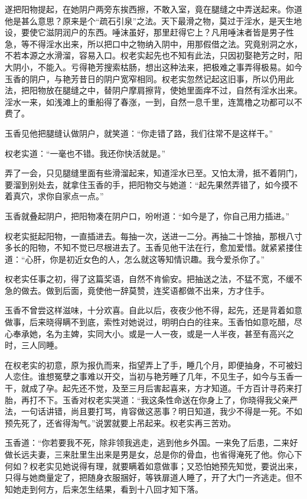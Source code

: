 \documentclass[a4paper,12pt,UTF8,twoside]{ctexbook}
\begin{document}
遂把阳物提起，在她阴户两旁东挨西擦，不敢入室，竟在腿缝之中弄送起来。你道他是甚么意思？原来是个“疏石引泉”之法。天下最滑之物，莫过于淫水，是天生地设，要使它滋阴润户的东西。唾沫虽好，那里赶得它上？凡用唾沫者皆是男子性急，等不得淫水出来，所以把口中之物纳入阴中，用那假借之法。究竟别洞之水，不若本源之水滑溜，容易入口。权老实起先也不知有此法，只因初娶艳芳之时，阳大阴小，不能入。亏得艳芳搜索枯肠，想出这种法来，把极难之事弄得极易。如今玉香的阴户，与艳芳昔日的阴户宽窄相同。权老实忽然记起这旧事，所以仍用此法，把阳物放在腿缝之中，替阴户摩肩擦背，使她里面痒不过，自然有淫水出来。淫水一来，如浅滩上的重船得了春涨，一到，自然一息千里，连篙橹之功都可以不费了。

玉香见他把腿缝认做阴户，就笑道：“你走错了路，我们往常不是这样干。”

权老实道：“一毫也不错。我还你快活就是。”

弄了一会，只见腿缝里面有些滑溜起来，知道淫水已至。又怕太滑，抵不着阴门，要溜到别处去，就拿住玉香的手，把阳物交与她道：“起先果然弄错了，如今摸不着真穴，求你自家点一点。”

玉香就叠起阴户，把阳物凑在阴户口，吩咐道：“如今是了，你自己用力插进。”

权老实挺起阳物，一直插进去。每抽一次，送进一二分。再抽二十馀抽，那根八寸多长的阳物，不知不觉已尽根进去了。玉香见他干法在行，愈加爱惜。就紧紧搂住道：“心肝，你是初近女色的人，怎么就这等知情识趣。我今爱杀你了。”

权老实任事之初，得了这篇奖语，自然不肯偷安。把抽送之法，不猛不宽，不缓不急的做去。做到后面，竟使他一辞莫赞，连奖语都做不出来，方才住手。

玉香不曾尝这样滋味，十分欢喜。自此以后，夜夜少他不得，起先，还是背着如意做事，后来晓得瞒不到底，索性对她说过，明明白白的往来。玉香怕如意吃醋，尽心奉承她，名为主婢，实同大小。或是一人一夜，或是一人半夜，甚至有高兴之时，三人同睡。

在权老实的初意，原为报仇而来，指望弄上了手，睡几个月，即便抽身，不可被妇人恋住。谁想冤孽之事难以开交，当初与艳芳睡了几年，不见生子，如今与玉香一干，就成了孕。起先还不觉，及至三月后害起喜来，方才知道。千方百计寻药来打胎，再打不下。玉香对权老实哭道：“我这条性命送在你身上了，你晓得我父亲严法，一句话讲错，尚且要打骂，肯容做这恶事？明日知道，我少不得是一死。不如预先死了，还省得淘气。”说罢就要上吊起来。权老实再三苦劝。

玉香道：“你若要我不死，除非领我逃走，逃到他乡外国。一来免了后患，二来好做长远夫妻，三来肚里生出来是男是女，总是你的骨血，也省得淹死了他。你心下何如？权老实见她说得有理，就要瞒着如意做事；又恐怕她预先知觉，要说出来，只得与她商量定了，把随身衣服捆好，等铁扉道人睡了，开了大门一齐逃走。但不知她走到何方，后来怎生结果，看到十八回才知下落。
\end{document}
